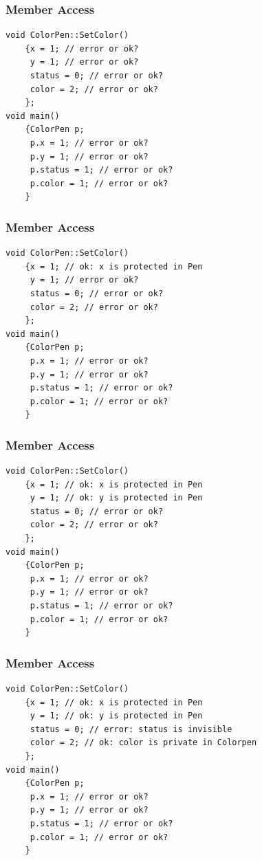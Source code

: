\documentclass{beamer}
\newtheorem{Key points}{Key points}
\begin{document}
\begin{frame}[fragile]
\frametitle{Member Access}
\begin{lstlisting}
void ColorPen::SetColor()
	{x = 1; // error or ok?
	 y = 1; // error or ok?
	 status = 0; // error or ok?
	 color = 2; // error or ok?
	};
void main()
	{ColorPen p;
	 p.x = 1; // error or ok?
	 p.y = 1; // error or ok?
	 p.status = 1; // error or ok?
	 p.color = 1; // error or ok?
	}
\end{lstlisting}
\end{frame}
\begin{frame}[fragile]
\frametitle{Member Access}
\begin{lstlisting}
void ColorPen::SetColor()
	{x = 1; // ok: x is protected in Pen
	 y = 1; // error or ok?
	 status = 0; // error or ok?
	 color = 2; // error or ok?
	};
void main()
	{ColorPen p;
	 p.x = 1; // error or ok?
	 p.y = 1; // error or ok?
	 p.status = 1; // error or ok?
	 p.color = 1; // error or ok?
	}
\end{lstlisting}
\end{frame}
\begin{frame}[fragile]
\frametitle{Member Access}
\begin{lstlisting}
void ColorPen::SetColor()
	{x = 1; // ok: x is protected in Pen
	 y = 1; // ok: y is protected in Pen
	 status = 0; // error or ok?
	 color = 2; // error or ok?
	};
void main()
	{ColorPen p;
	 p.x = 1; // error or ok?
	 p.y = 1; // error or ok?
	 p.status = 1; // error or ok?
	 p.color = 1; // error or ok?
	}
\end{lstlisting}
\end{frame}

\begin{frame}[fragile]
\frametitle{Member Access}
\begin{lstlisting}
void ColorPen::SetColor()
	{x = 1; // ok: x is protected in Pen
	 y = 1; // ok: y is protected in Pen
	 status = 0; // error: status is invisible
	 color = 2; // ok: color is private in Colorpen
	};
void main()
	{ColorPen p;
	 p.x = 1; // error or ok?
	 p.y = 1; // error or ok?
	 p.status = 1; // error or ok?
	 p.color = 1; // error or ok?
	}
\end{lstlisting}
\end{frame}

\end{document}
